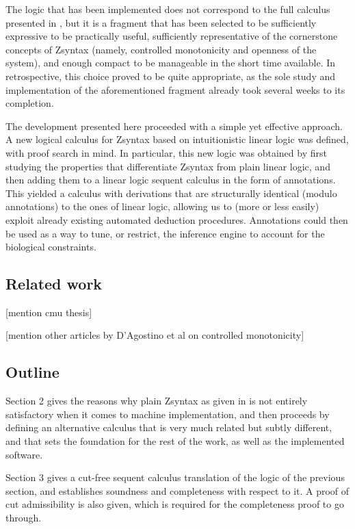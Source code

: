 The logic that has been implemented does not correspond to the full calculus
presented in \cite{adding-logic}, but it is a fragment that has been selected to
be sufficiently expressive to be practically useful, sufficiently representative
of the cornerstone concepts of Zsyntax (namely, controlled monotonicity and
openness of the system), and enough compact to be manageable in the short time
available. In retrospective, this choice proved to be quite appropriate, as the
sole study and implementation of the aforementioned fragment already took
several weeks to its completion.

The development presented here proceeded with a simple yet effective approach. A
new logical calculus for Zsyntax based on intuitionistic linear logic was
defined, with proof search in mind. In particular, this new logic was obtained
by first studying the properties that differentiate Zsyntax from plain linear
logic, and then adding them to a linear logic sequent calculus in the form of
annotations.  This yielded a calculus with derivations that are structurally
identical (modulo annotations) to the ones of linear logic, allowing us to (more
or less easily) exploit already existing automated deduction
procedures. Annotations could then be used as a way to tune, or restrict, the
inference engine to account for the biological constraints.

\subsection{Related work}

[mention cmu thesis]

[mention other articles by D'Agostino et al on controlled monotonicity]

\subsection{Outline}

Section 2 gives the reasons why plain Zsyntax as given in \cite{adding-logic} is
not entirely satisfactory when it comes to machine implementation, and then
proceeds by defining an alternative calculus that is very much related but
subtly different, and that sets the foundation for the rest of the work, as well
as the implemented software.

Section 3 gives a cut-free sequent calculus translation of the logic of the
previous section, and establishes soundness and completeness with respect to
it. A proof of cut admissibility is also given, which is required for the
completeness proof to go through.

